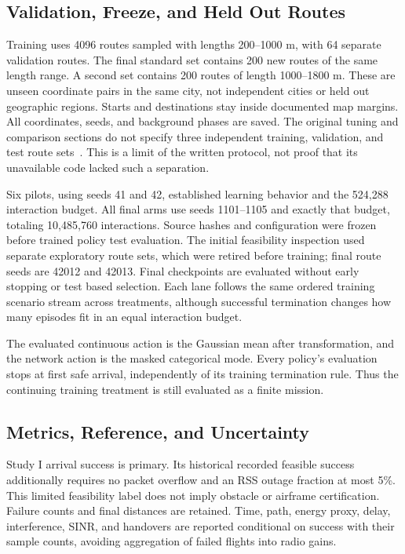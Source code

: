 \documentclass[conference]{IEEEtran}
\begin{document}
\subsection{Validation, Freeze, and Held Out Routes}
Training uses 4096 routes sampled with lengths 200--1000 m, with 64 separate
validation routes. The final standard set contains 200 new routes of the same
length range. A second set contains 200 routes of length 1000--1800 m. These
are unseen coordinate pairs in the same city, not independent cities or held
out geographic regions. Starts and destinations stay inside documented map
margins. All coordinates, seeds, and background phases are saved.
The original tuning and comparison sections do not specify three independent
training, validation, and test route sets~\cite[pp.~15--16, Secs.~6.2--6.3]{thesis}.
This is a limit of the written protocol, not proof that its unavailable code
lacked such a separation.

Six pilots, using seeds 41 and 42, established learning behavior and the
524,288 interaction budget. All final arms use seeds 1101--1105 and exactly
that budget, totaling 10,485,760 interactions. Source hashes and configuration
were frozen before trained policy test evaluation. The initial feasibility
inspection used separate exploratory route sets, which were retired before
training; final route seeds are 42012 and 42013. Final checkpoints are evaluated
without early stopping or test based selection. Each lane follows the same
ordered training scenario stream across treatments, although successful
termination changes how many episodes fit in an equal interaction budget.

The evaluated continuous action is the Gaussian mean after transformation, and
the network action is the masked categorical mode. Every policy's evaluation
stops at first safe arrival, independently of its training termination rule.
Thus the continuing training treatment is still evaluated as a finite mission.

\subsection{Metrics, Reference, and Uncertainty}
Study I arrival success is primary. Its historical recorded feasible success additionally requires
no packet overflow and an RSS outage fraction at most 5\%. This limited
feasibility label does not imply obstacle or airframe certification. Failure
counts and final distances are retained. Time, path, energy proxy, delay,
interference, SINR, and handovers are reported conditional on success with
their sample counts, avoiding aggregation of failed flights into radio gains.
\end{document}
